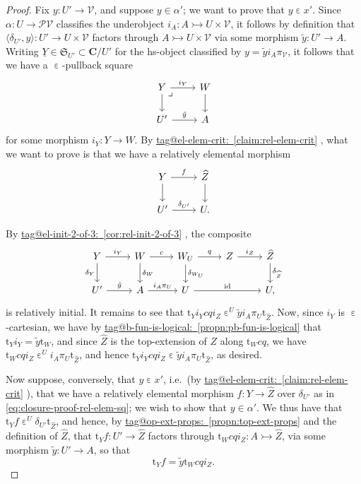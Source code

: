 \documentclass{amsart}
\makeatletter
\newcommand\bC{\mathbf{C}}
\newcommand\br[1]{\langle{}#1\rangle{}}
\newcommand\cV{\mathcal{V}}
\newcommand\ein{\mathrel{\varepsilon}}
\newcommand\fS{\mathfrak{S}}
\newcommand\id{\mathrm{id}}
\newcommand\pb[1][rd]{\ar[#1, phantom, "\lrcorner", pos=0]}
\newcommand\pow{\mathcal{P}}
\newcommand\rt{\mathrm{t}}
\newcommand\tto{\rightarrowtail}
\newcommand\und[1]{\underline{#1}}
\newcommand\unein{{\ein}}
\newcommand\wh[1]{\widehat{#1}}
\newcommand\tagword[1]{\csname tag@#1\endcsname}
\def\label@tag#1:#2\@nil{#1}
\newcommand\labeltag[1]{\label@tag#1:\@nil}
\newcommand\jref[1]{%
  \texorpdfstring%
    {\hyperref[#1]{\tagword{\labeltag{#1}}~\ref*{#1}}}%
    {\tagword{\labeltag{#1}}~\ref*{#1}}%
}
\theoremstyle{definition}
\theoremstyle{remark}
\theoremstyle{plainwithref}
\makeatother
\begin{document}
\begin{proof}
  Fix \( y \colon U' \to \cV \), and suppose \( y \in \alpha' \); we want to prove that \( y \ein x' \).
  Since \( \alpha \colon U \to \pow \cV \) classifies the underobject \( i_A \colon A \tto U \times \cV \), it follows by definition that \( \br{\delta_{U'}, y} \colon U' \to U \times \cV \) factors through \( A \tto U \times \cV \) via some morphism \( \tilde y \colon U' \to A \).
  Writing \( \und Y \in \fS_{U'} \subset \bC / U' \) for the hs-object classified by \( y = \tilde y i_A \pi_{\cV} \), it follows that we have a \( \unein \)-pullback square
  \begin{equation} \label{eq:closure-proof-pb-sq}
    \begin{tikzcd}
      Y \pb \ar[r, "i_Y"] \ar[d] & W \ar[d] \\
      U' \ar[r, "\tilde y"] & A
    \end{tikzcd}
\end{equation}
  for some morphism \( i_Y \colon Y \to W \).
  By \jref{claim:rel-elem-crit}, what we want to prove is that we have a relatively elemental morphism
  \begin{equation} \label{eq:closure-proof-rel-elem-sq}
    \begin{tikzcd}
      Y \ar[r, "f"] \ar[d] & \wh Z \ar[d] \\
      U' \ar[r, "\delta_{U'}"] & U.
    \end{tikzcd}
  \end{equation}

  By \jref{cor:rel-init-2-of-3}, the composite
  \[
    \begin{tikzcd}
      Y \ar[r, "i_Y"] \ar[d, "\delta_Y"'] &
      W \ar[r, "c"] \ar[d, "\delta_W"] &
      W_U \ar[r, "q"] \ar[d, "\delta_{W_U}"] &
      Z \ar[r, "i_Z"] &
      \wh Z \ar[d, "\delta_{\wh Z}"] \\
      U' \ar[r, "\tilde y"] &
      A \ar[r, "i_A \pi_U"]
      & U \ar[rr, "\id"]
      && U,
    \end{tikzcd}
  \]
  is relatively initial.
  It remains to see that \( \rt_Y i_Y c q i_Z \ein^U \tilde y i_A \pi_U \rt_{\wh Z} \).
  Now, since \( i_Y \) is \( \ein \)-cartesian, we have by \jref{propn:pb-fun-is-logical} that \( \rt_Y i_Y = \tilde y \rt_W \), and since \( \wh Z \) is the top-extension of \( Z \) along \( \rt_W c q \), we have \( \rt_W c q i_Z \ein^U i_A \pi_U \rt_{\wh Z} \), and hence \( \rt_Y i_Y c q i_Z \ein \tilde y i_A \pi_U \rt_{\wh Z} \), as desired.

  Now suppose, conversely, that \( y \ein x' \), i.e.\ (by \jref{claim:rel-elem-crit}), that we have a relatively elemental morphism \( f \colon Y \to \wh Z \) over \( \delta_{U'} \) as in \eqref{eq:closure-proof-rel-elem-sq}; we wish to show that \( y \in \alpha' \).
  We thus have that \( \rt_Y f \ein^U \delta_{U'} \rt_{\wh Z} \), and hence, by \jref{propn:top-ext-props} and the definition of \( \wh Z \), that \( \rt_Y f \colon  U' \to \wh Z \) factors through \( \rt_W c q i_Z \colon A \tto \wh Z \), via some morphism \( \tilde y \colon U' \to A \), so that
  \begin{equation} \label{eq:image-arg-eq-1}
    \rt_Y f = \tilde y \rt_W c q i_Z.
  \end{equation}


\end{proof}
\end{document}
